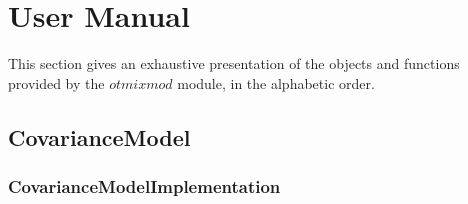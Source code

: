 
\section{User Manual}

This section gives an exhaustive presentation of the objects and functions provided by the $otmixmod$ module, in the alphabetic order.

\subsection{CovarianceModel}

\subsubsection{CovarianceModelImplementation}


